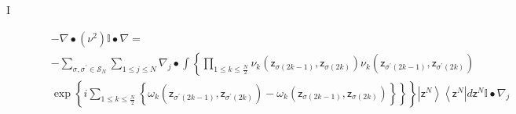 \documentclass[aps,preprint]{revtex4}%
\begin{document}
\begin{description}
\item[I]
\begin{align}
&  -\nabla\bullet\left(  \nu^{2}\right)  \mathbb{I}\bullet\nabla\left.
=\right. \nonumber\\
&  -%
{\textstyle\sum\limits_{\sigma,\sigma^{\prime}\in\mathcal{S}_{N}}}
{\displaystyle\sum\limits_{1\leq j\leq N}}
\nabla_{j}\bullet\int\left\{
{\displaystyle\prod\limits_{1\leq k\leq\frac{N}{2}}}
\nu_{k}\left(  \mathsf{z}_{\sigma\left(  2k-1\right)  },\mathsf{z}%
_{\sigma\left(  2k\right)  }\right)  \nu_{k}\left(  \mathsf{z}_{\sigma
^{\prime}\left(  2k-1\right)  },\mathsf{z}_{\sigma^{\prime}\left(  2k\right)
}\right)  \right. \nonumber\\
&  \left.  \exp\left\{  i%
{\displaystyle\sum\limits_{1\leq k\leq\frac{N}{2}}}
\left\{  \omega_{k}\left(  \mathsf{z}_{\sigma^{\prime}\left(  2k-1\right)
},\mathsf{z}_{\sigma^{\prime}\left(  2k\right)  }\right)  -\omega_{k}\left(
\mathsf{z}_{\sigma\left(  2k-1\right)  },\mathsf{z}_{\sigma\left(  2k\right)
}\right)  \right\}  \right\}  \right\}  \left\vert \mathsf{z}^{N}\right\rangle
\left\langle \mathsf{z}^{N}\right\vert d\mathsf{z}^{N}\mathbb{I}\bullet
\nabla_{j}%
\end{align}



\end{description}
\end{document}
